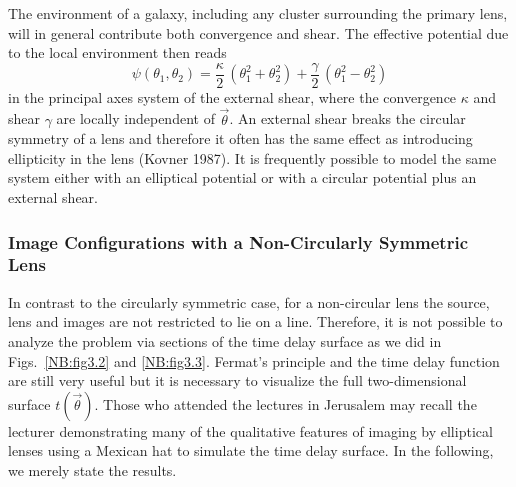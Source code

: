 \documentclass[a4paper,10pt]{article} %
\begin{document}
The environment of a galaxy, including any cluster surrounding the
primary lens, will in general contribute both convergence and
shear. The effective potential due to the local environment then reads
\begin{equation}
  \psi(\theta_1,\theta_2) =
  \frac{\kappa}{2}\,(\theta_1^2+\theta_2^2) +
  \frac{\gamma}{2}\,(\theta_1^2-\theta_2^2)
\label{eq:3.30}
\end{equation}
in the principal axes system of the external shear, where the
convergence $\kappa$ and shear $\gamma$ are locally independent of
$\vec\theta$. An external shear breaks the circular symmetry of a lens
and therefore it often has the same effect as introducing ellipticity
in the lens (Kovner 1987). It is frequently possible to model the same
system either with an elliptical potential or with a circular
potential plus an external shear.

\subsubsection{Image Configurations with a Non-Circularly Symmetric
Lens}
\label{NB:subsubsect3.5.3}

In contrast to the circularly symmetric case, for a non-circular lens
the source, lens and images are not restricted to lie on a line.
Therefore, it is not possible to analyze the problem via sections of
the time delay surface as we did in Figs.\ \ref{NB:fig3.2} and
\ref{NB:fig3.3}. Fermat's principle and the time delay function are
still very useful but it is necessary to visualize the full
two-dimensional surface $t(\vec\theta)$. Those who attended the
lectures in Jerusalem may recall the lecturer demonstrating many of
the qualitative features of imaging by elliptical lenses using a
Mexican hat to simulate the time delay surface. In the following, we
merely state the results.
\end{document}
